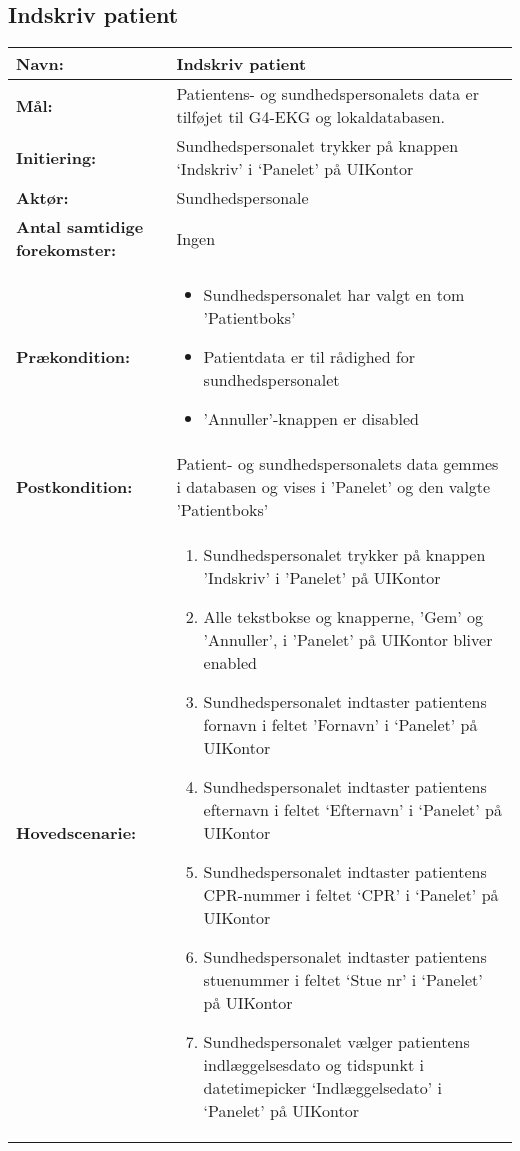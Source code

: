 \subsection{Indskriv patient}
\begin{table}[H]
\begin{tabular}{|p{5.5cm}|p{10cm}|}
\hline
\textbf{Navn:} & \textbf{Indskriv patient}\\\hline
\textbf{Mål:} & Patientens- og sundhedspersonalets data er tilføjet til G4-EKG og lokaldatabasen. \\\hline
\textbf{Initiering:} & Sundhedspersonalet trykker på knappen ‘Indskriv’ i ‘Panelet’ på UIKontor \\\hline
\textbf{Aktør:} & Sundhedspersonale \\\hline
\textbf{Antal samtidige forekomster:} & Ingen \\\hline
\textbf{Prækondition:} & \begin{itemize}[label=$\circ$]
\item{Sundhedspersonalet har valgt en tom 'Patientboks'}
\item{Patientdata er til rådighed for sundhedspersonalet}
\item{'Annuller'-knappen er disabled }
 \end{itemize}
\\\hline
\textbf{Postkondition:} & Patient- og sundhedspersonalets data gemmes i databasen og vises i 'Panelet' og den valgte 'Patientboks' \\\hline
\textbf{Hovedscenarie:} &
{\begin{enumerate}
\item{Sundhedspersonalet trykker på knappen 'Indskriv' i 'Panelet' på UIKontor}
\item{Alle tekstbokse og knapperne, 'Gem' og 'Annuller', i 'Panelet' på UIKontor bliver enabled}
\item{Sundhedspersonalet indtaster patientens fornavn i feltet 'Fornavn' i ‘Panelet’ på UIKontor} 
\item{Sundhedspersonalet indtaster patientens efternavn i feltet ‘Efternavn’ i ‘Panelet’ på UIKontor}
\item{Sundhedspersonalet indtaster patientens CPR-nummer i feltet ‘CPR’ i ‘Panelet’ på UIKontor}
\item{Sundhedspersonalet indtaster patientens stuenummer i feltet ‘Stue nr’ i ‘Panelet’ på UIKontor}
\item{Sundhedspersonalet vælger patientens indlæggelsesdato og tidspunkt i datetimepicker ‘Indlæggelsedato’ i ‘Panelet’ på UIKontor}

\end{enumerate}}
\end{tabular}
\end{table}
